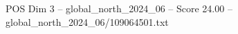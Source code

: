 \begin{textsample}{POS Dim 3 – global\_north\_2024\_06 – Score 24.00 – global\_north\_2024\_06/109064501.txt}
\end{textsample}
